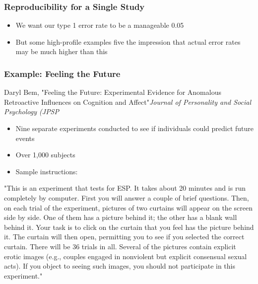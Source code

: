 \documentclass[10pt, block=fill]{beamer}
\begin{document}
\begin{frame}
  \frametitle{Reproducibility for a Single Study}
  
  \begin{itemize}
    \item We want our type 1 error rate to be a manageable 0.05
    \item But some high-profile examples five the impression that actual error rates may be much higher than this
  \end{itemize}
    
\end{frame}

\begin{frame}
  \frametitle{Example: Feeling the Future}
  Daryl Bem, "Feeling the Future: Experimental Evidence for Anomalous Retroactive Influences on Cognition and Affect"\textit{Journal of Personality and Social Psychology (JPSP}
  \begin{itemize}
    \item Nine separate experiments conducted to see if individuals could predict future events
    \item Over 1,000 subjects
    \item Sample instructions:
  \end{itemize}

  \tiny{"This is an experiment that tests for ESP. It takes about 20 minutes and is run completely by computer. First you will answer a couple of brief questions. Then, on each trial of the experiment, pictures of two curtains will appear on the screen side by side. One of them has a picture behind it; the other has a blank wall behind it. Your task is to click on the curtain that you feel has the picture behind it. The curtain will then open, permitting you to see if you selected the correct curtain. There will be 36 trials in all. Several of the pictures contain explicit erotic images (e.g., couples engaged in nonviolent but explicit consensual sexual acts). If you object to seeing such images, you should not participate in this experiment."}

\end{frame}
\end{document}
